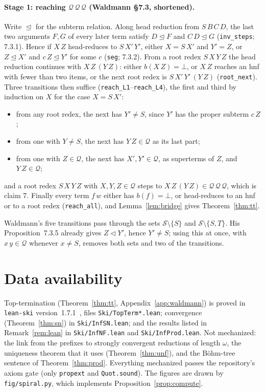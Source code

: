 \documentclass[11pt]{amsart}
\theoremstyle{definition}
\theoremstyle{remark}
\newcommand{\lean}[1]{\texttt{#1}}
\newcommand{\Ter}{\mathcal S}
\newcommand{\Q}{\mathcal Q}
\begin{document}
\paragraph{Stage 1: reaching $\Q\,\Q\,\Q$ (Waldmann \S7.3, shortened).} Write $\trianglelefteq$ for the subterm relation. Along head reduction
from $S\,B\,C\,D$, the last two arguments $F,G$ of every later term satisfy $D\trianglelefteq F$
and $C\,D\trianglelefteq G$ (\lean{inv\_steps}; 7.3.1). Hence if $X\,Z$ head-reduces to
$S\,X'\,Y'$, either $X=S\,X'$ and $Y'=Z$, or $Z\trianglelefteq X'$ and $c\,Z\trianglelefteq Y'$
for some $c$ (\lean{seg}; 7.3.2). From a root redex $S\,X\,Y\,Z$ the head reduction continues
with $X\,Z\,(Y\,Z)$: either $b(X\,Z)=\bot$, or $X\,Z$ reaches an hnf with fewer than two items,
or the next root redex is $S\,X'\,Y'\,(Y\,Z)$ (\lean{root\_next}). Three transitions then suffice
(\lean{reach\_L1}--\lean{reach\_L4}), the first and third by induction on $X$ for the case
$X=S\,X'$:
\begin{itemize}
\item from any root redex, the next has $Y'\ne S$, since $Y'$ has the proper subterm $c\,Z$;
\item from one with $Y\ne S$, the next has $Y\,Z\in\Q$ as its last part;
\item from one with $Z\in\Q$, the next has $X',Y'\in\Q$, as superterms of $Z$, and $Y\,Z\in\Q$;
\end{itemize}
and a root redex $S\,X\,Y\,Z$ with $X,Y,Z\in\Q$ steps to $X\,Z\,(Y\,Z)\in\Q\,\Q\,\Q$, which is
claim 7. Finally every term $f\,w$ either has $b(f)=\bot$, or head-reduces to an hnf or to a
root redex (\lean{reach\_all}), and Lemma~\ref{lem:bridge} gives Theorem~\ref{thm:tt}.

Waldmann's five transitions pass through the sets $\Ter\setminus\{S\}$ and
$\Ter\setminus\{S,T\}$. His Proposition~7.3.5 already gives $Z\triangleleft Y'$, hence
$Y'\ne S$; using this at once, with $x\,y\in\Q$ whenever $x\ne S$, removes both sets and two of
the transitions.

\section*{Data availability}
\sloppy
Top-termination (Theorem~\ref{thm:tt}, Appendix~\ref{app:waldmann}) is proved in
\texttt{lean-ski} version~1.7.1~\citep{leanski}, files \texttt{Ski/TopTerm*.lean}; convergence
(Theorem~\ref{thm:sn}) in \texttt{Ski/InfSN.lean}; and the results listed in
Remark~\ref{rem:lean} in \texttt{Ski/InfNF.lean} and \texttt{Ski/InfProd.lean}. Not
mechanized: the link from the prefixes to strongly convergent reductions of length $\omega$,
the uniqueness theorem that it uses (Theorem~\ref{thm:unf}), and the B\"ohm-tree sentence of
Theorem~\ref{thm:prod}. Everything mechanized passes the repository's axiom gate (only
\texttt{propext} and \texttt{Quot.sound}). The figures are drawn by
\texttt{fig/spiral.py}, which implements Proposition~\ref{prop:compute}.



\end{document}
